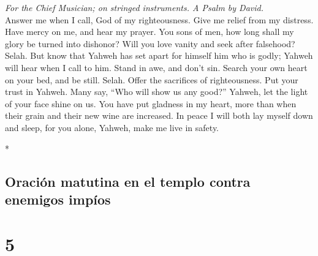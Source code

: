 \begin{paracol}{2}
\begin{otherlanguage}{english}
\emph{For the Chief Musician; on stringed instruments. A Psalm by
David.}\\
 Answer me when I call, God of my righteousness. Give me
relief from my distress. Have mercy on me, and hear my prayer.
 You sons of men, how long shall my glory be turned into
dishonor? Will you love vanity and seek after falsehood? Selah.
 But know that Yahweh has set apart for himself him who is
godly; Yahweh will hear when I call to him.  Stand in awe,
and don't sin. Search your own heart on your bed, and be still. Selah.
 Offer the sacrifices of righteousness. Put your trust in
Yahweh.  Many say, ``Who will show us any good?'' Yahweh,
let the light of your face shine on us.  You have put
gladness in my heart, more than when their grain and their new wine are
increased.  In peace I will both lay myself down and
sleep, for you alone, Yahweh, make me live in safety.

\end{otherlanguage}

\switchcolumn[0]*

\hypertarget{oraciuxf3n-matutina-en-el-templo-contra-enemigos-impuxedos}{%
\subsection{Oración matutina en el templo contra enemigos
impíos}\label{oraciuxf3n-matutina-en-el-templo-contra-enemigos-impuxedos}}

\hypertarget{section-8}{%
\section{5}\label{section-8}}


\end{paracol}
